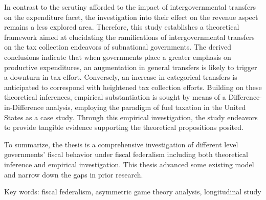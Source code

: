 In contrast to the scrutiny afforded to the impact of intergovernmental transfers on the expenditure facet, the investigation into their effect on the revenue aspect remains a less explored area. Therefore, this study establishes a theoretical framework aimed at elucidating the ramifications of intergovernmental transfers on the tax collection endeavors of subnational governments. The derived conclusions indicate that when governments place a greater emphasis on productive expenditures, an augmentation in general transfers is likely to trigger a downturn in tax effort. Conversely, an increase in categorical transfers is anticipated to correspond with heightened tax collection efforts. Building on these theoretical inferences, empirical substantiation is sought by means of a Difference-in-Difference analysis, employing the paradigm of fuel taxation in the United States as a case study. Through this empirical investigation, the study endeavors to provide tangible evidence supporting the theoretical propositions posited.

To summarize, the thesis is a comprehensive investigation of different level governments’  fiscal behavior under fiscal federalism including both theoretical inference and empirical investigation. This thesis advanced some existing model and narrow down the gaps in prior research.

Key words: fiscal federalism, asymmetric game theory analysis, longitudinal study


\vspace{-0.3in}
